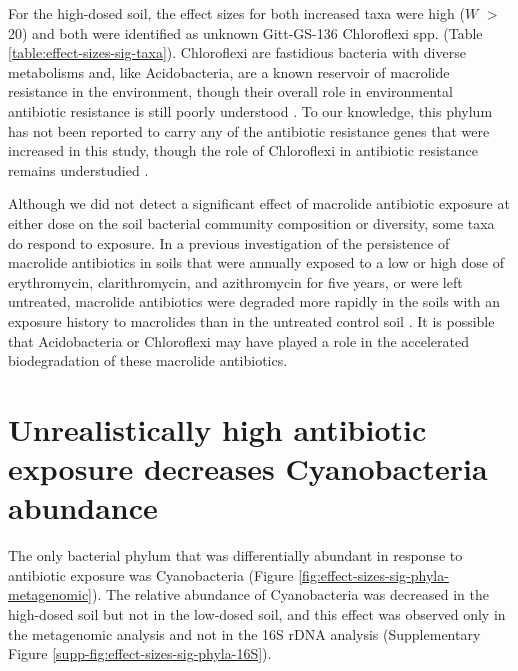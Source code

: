 For the high-dosed soil, the effect sizes for both increased taxa were high ($W$ $>$ 20) and both were identified as unknown Gitt-GS-136 Chloroflexi spp. (Table \ref{table:effect-sizes-sig-taxa}).
Chloroflexi are fastidious bacteria with diverse metabolisms and, like Acidobacteria, are a known reservoir of macrolide resistance in the environment, though their overall role in environmental antibiotic resistance is still poorly understood \parencite{Gupta.2013, Islam.2019, Yi.2019}.
To our knowledge, this phylum has not been reported to carry any of the antibiotic resistance genes that were increased in this study, though the role of Chloroflexi in antibiotic resistance remains understudied \parencite{Razavi.2017}.

Although we did not detect a significant effect of macrolide antibiotic exposure at either dose on the soil bacterial community composition or diversity, some taxa do respond to exposure.
In a previous investigation of the persistence of macrolide antibiotics in soils that were annually exposed to a low or high dose of erythromycin, clarithromycin, and azithromycin for five years, or were left untreated, macrolide antibiotics were degraded more rapidly in the soils with an exposure history to macrolides than in the untreated control soil \parencite{Topp.2016}.
It is possible that Acidobacteria or Chloroflexi may have played a role in the accelerated biodegradation of these macrolide antibiotics.

\section{Unrealistically high antibiotic exposure decreases Cyanobacteria abundance}

The only bacterial phylum that was differentially abundant in response to antibiotic exposure was Cyanobacteria (Figure \ref{fig:effect-sizes-sig-phyla-metagenomic}).
The relative abundance of Cyanobacteria was decreased in the high-dosed soil but not in the low-dosed soil, and this effect was observed only in the metagenomic analysis and not in the 16S rDNA analysis (Supplementary Figure \ref{supp-fig:effect-sizes-sig-phyla-16S}).

